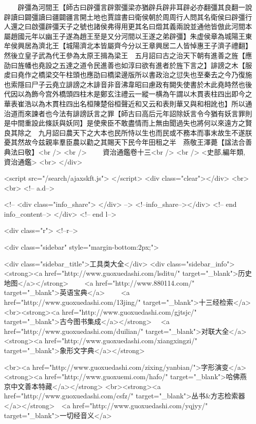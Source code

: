 　　辟彊為河間王【師古曰辟彊言辟禦彊梁亦猶辟兵辟非耳辟必亦翻彊其良翻一說辟讀曰闢彊讀曰疆闢疆言開土地也賈誼書曰衛侯朝於周周行人問其名衛侯曰辟彊行人還之曰啟彊辟彊天子之號也諸侯弗得用更其名曰燬其義兩說並通他皆倣此河間本屬趙國元年以幽王子遂為趙王至是又分河間以王遂之弟辟彊】朱虚侯章為城陽王東牟侯興居為濟北王【城陽濟北本皆屬齊今分以王章興居二人皆悼惠王子濟子禮翻】然後立皇子武為代王參為太原王揖為梁王　五月詔曰古之治天下朝有進善之旌【應劭曰旌幡也堯設之五達之道令民進善也如淳曰欲有進者於旌下言之】誹謗之木【服䖍曰堯作之橋梁交午柱頭也應劭曰橋梁邊版所以書政治之愆失也至秦去之今乃復施也索隱曰尸子云堯立誹謗之木誹音非音沸韋昭曰慮政有闕失使書於木此堯時然也後代因以為飾今宫外橋頭四柱木是鄭玄注禮云一縱一横為午謂以木貫表柱四出即今之華表崔浩以為木貫柱四出名桓陳楚俗桓聲近和又云和表則華又與和相訛也】所以通治道而來諫者也今法有誹謗訞言之罪【師古曰高后元年詔除妖言令今猶有妖言罪則是中間重設此條訞與妖同】是使衆臣不敢盡情而上無由聞過失也將何以來遠方之賢良其除之　九月詔曰農天下之大本也民所恃以生也而民或不務本而事末故生不遂朕憂其然故今兹親率羣臣農以勸之其賜天下民今年田租之半　燕敬王澤薨【諡法合善典法曰敬】<br />
<br />
　　資治通鑑卷十三<br />
<br />
<史部,編年類,資治通鑑>  <br>
   </div> 

<script src="/search/ajaxskft.js"> </script>
 <div class="clear"></div>
<br>
<br>
 <!-- a.d-->

 <!--
<div class="info_share">
</div> 
-->
 <!--info_share--></div>   <!-- end info_content-->
  </div> <!-- end l-->

<div class="r">   <!--r-->



<div class="sidebar"  style="margin-bottom:2px;">

 
<div class="sidebar_title">工具类大全</div>
<div class="sidebar_info">
<strong><a href="http://www.guoxuedashi.com/lsditu/" target="_blank">历史地图</a></strong>　　
<a href="http://www.880114.com/" target="_blank">英语宝典</a>　　
<a href="http://www.guoxuedashi.com/13jing/" target="_blank">十三经检索</a>　
<br><strong><a href="http://www.guoxuedashi.com/gjtsjc/" target="_blank">古今图书集成</a></strong>　
<a href="http://www.guoxuedashi.com/duilian/" target="_blank">对联大全</a>　<strong><a href="http://www.guoxuedashi.com/xiangxingzi/" target="_blank">象形文字典</a></strong>　

<br><a href="http://www.guoxuedashi.com/zixing/yanbian/">字形演变</a>　　<strong><a href="http://www.guoxuemi.com/hafo/" target="_blank">哈佛燕京中文善本特藏</a></strong>
<br><strong><a href="http://www.guoxuedashi.com/csfz/" target="_blank">丛书&方志检索器</a></strong>　<a href="http://www.guoxuedashi.com/yqjyy/" target="_blank">一切经音义</a>　　

